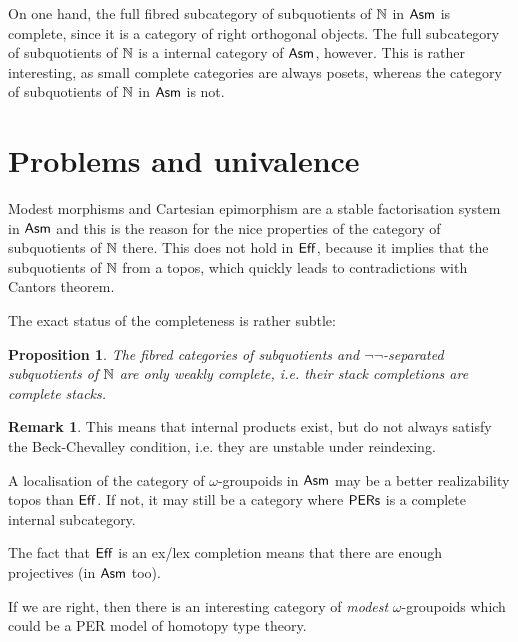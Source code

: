 \documentclass[12pt, a4paper]{article}
\theoremstyle{plain}
\newtheorem{prop}[theorem]{Proposition}
\theoremstyle{definition}
\newtheorem{remark}[theorem]{Remark}
\begin{document}
On one hand, the full fibred subcategory of subquotients of $\mathbb N$ in $\mathsf{Asm}$ is complete, since it is a category of right orthogonal objects. The full subcategory of subquotients of $\mathbb N$ is a internal category of $\mathsf{Asm}$, however. This is rather interesting, as small complete categories are always posets, whereas the category of subquotients of $\mathbb N$ in $\mathsf{Asm}$ is not.


\section{Problems and univalence}
Modest morphisms and Cartesian epimorphism are a stable factorisation system in $\mathsf{Asm}$ and this is the reason for the nice properties of the category of subquotients of $\mathbb N$ there. This does not hold in $\mathsf{Eff}$, because it implies that the subquotients of $\mathbb N$ from a topos, which quickly leads to contradictions with Cantors theorem.

The exact status of the completeness is rather subtle:

\begin{prop} The fibred categories of subquotients and $\neg\neg$-separated subquotients of $\mathbb N$ are only weakly complete, i.e. their stack completions are complete stacks. \end{prop}

\begin{remark} This means that internal products exist, but do not always satisfy the Beck-Chevalley condition, i.e. they are unstable under reindexing. \end{remark}

A localisation of the category of $\omega$-groupoids in $\mathsf{Asm}$ may be a better realizability topos than $\mathsf{Eff}$. If not, it may still be a category where $\mathsf{PERs}$ is a complete internal subcategory.

The fact that $\mathsf{Eff}$ is an ex/lex completion means that there are enough projectives (in $\mathsf{Asm}$ too).

If we are right, then there is an interesting category of \emph{modest} $\omega$-groupoids which could be a PER model of homotopy type theory.

{}

\end{document}
